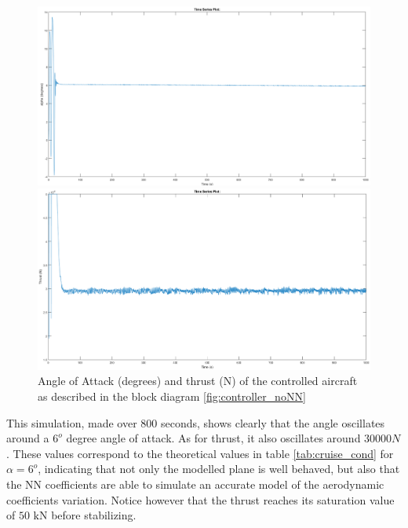 \begin{figure}
\centering
\begin{minipage}{\textwidth}
\includegraphics[width=1.1\textwidth]{Figures/Results/aoa_check.PNG}
\end{minipage}
\begin{minipage}{\textwidth}
\includegraphics[width=1.1\textwidth]{Figures/Results/thrust_check.PNG}
\end{minipage}
\caption[AoA and thrust validation]{Angle of Attack (degrees) and thrust (N) of the controlled aircraft as described in the block diagram \ref{fig:controller_noNN}}
\label{fig:model_validation}
\end{figure}

This simulation, made over 800 seconds, shows clearly that the angle oscillates around a $6^o$ degree angle of attack. As for thrust, it also oscillates around $30000N$. These values correspond to the theoretical values in table \ref{tab:cruise_cond} for $\alpha=6^o$, indicating that not only the modelled plane is well behaved, but also that the NN coefficients are able to simulate an accurate model of the aerodynamic coefficients variation. Notice however that the thrust reaches its saturation value of $50\text{ kN}$ before stabilizing.
